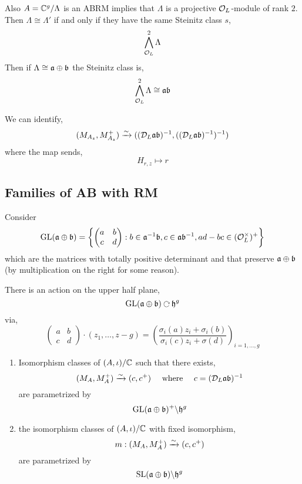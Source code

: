 \documentclass[12pt]{article}
\begin{document}
\begin{rmk}
Also $A = \mathbb{C}^g / \Lambda$ is an ABRM implies that $\Lambda$ is a projective $\mathcal{O}_L$-module of rank $2$. Then $\Lambda \cong \Lambda'$ if and only if they have the same Steinitz class $s$,
\[ \bigwedge^2_{\mathcal{O}_L} \Lambda \]
Then if $\Lambda \cong \mathfrak{a} \oplus \mathfrak{b}$ the Steinitz class is,
\[ \bigwedge_{\mathcal{O}_L}^2 \Lambda \cong \mathfrak{a} \mathfrak{b} \]
\end{rmk}

\begin{rmk}
We can identify,
\[ (M_{A_z}, M_{A_z}^+) \xrightarrow{\sim} ((\mathcal{D}_L \mathfrak{a} \mathfrak{b})^{-1}, ((\mathcal{D}_L \mathfrak{a} \mathfrak{b})^{-1})^{-1}) \]
where the map sends,
\[ H_{r,z} \mapsto r \]
\end{rmk}

\subsection{Families of AB with RM}

\begin{defn}
Consider 
\[ \mathrm{GL}(\mathfrak{a} \oplus \mathfrak{b}) = \left\{
\begin{pmatrix}
a & b 
\\
c & d
\end{pmatrix} :
b \in \mathfrak{a}^{-1} \mathfrak{b}, c \in \mathfrak{a} \mathfrak{b}^{-1}, ad - bc \in (\mathcal{O}_L^\times)^+ \right\} \]
which are the matrices with totally positive determinant and that preserve $\mathfrak{a} \oplus \mathfrak{b}$ (by multiplication on the right for some reason).  
\end{defn}

\begin{defn}
There is an action on the upper half plane,
\[ \GL(\a \oplus \b) \acts \h^g \]
via,
\[ \begin{pmatrix}
a & b
\\
c & d
\end{pmatrix}
\cdot (z_1, \dots, z-g) = \left( \frac{\sigma_i(a) z_i + \sigma_i(b)}{\sigma_i(c) z_i + \sigma(d)} \right)_{i = 1, \dots, g} \]
\end{defn}

\begin{thm}
\begin{enumerate}
\item Isomorphism classes of $(A, \iota) / \mathbb{C}$ such that there exists,
\[ (M_A, M_A^+) \xrightarrow{\sim} (c, c^+) \quad \text{ where } \quad c = (\mathcal{D}_L \mathfrak{a} \mathfrak{b})^{-1} \]
are parametrized by 
\[ \mathrm{GL}(\mathfrak{a} \oplus \mathfrak{b})^+ \backslash \mathfrak{h}^g \]
\item the isomorphism classes of $(A, \iota) / \mathbb{C}$ with fixed isomorphism,
\[ m : (M_A, M_A^+) \xrightarrow{\sim} (c, c^+) \]
are parametrized by
\[ \mathrm{SL}(\mathfrak{a} \oplus \mathfrak{b}) \backslash \mathfrak{h}^g \]
\end{enumerate}
\end{thm}
\end{document}
